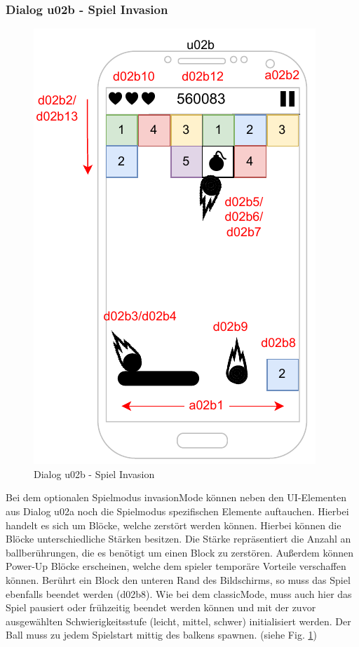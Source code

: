 \subsubsection{Dialog u02b - Spiel Invasion}\label{dialog:invasion}

\begin{figure}[h!]
    \begin{center}
    \includegraphics[scale=1.4]{diagramme/pdf/Mockup-u02b.pdf}
    \end{center}
    \caption{Dialog u02b - Spiel Invasion}\label{fig:dia:u02b}
\end{figure}

Bei dem optionalen Spielmodus \gls{invasionMode} können neben den UI-Elementen aus Dialog u02a noch die Spielmodus spezifischen Elemente auftauchen. 
Hierbei handelt es sich um Blöcke, welche zerstört werden können. Hierbei können die Blöcke unterschiedliche Stärken besitzen. 
Die Stärke repräsentiert die Anzahl an \gls{ball}berührungen, die es benötigt um einen Block zu zerstören. Außerdem können Power-Up Blöcke
erscheinen, welche dem \gls{spieler} temporäre Vorteile verschaffen können. Berührt ein Block den unteren Rand des Bildschirms, so muss das Spiel ebenfalls beendet werden (d02b8).
Wie bei dem \gls{classicMode}, muss auch hier das Spiel pausiert oder frühzeitig beendet werden können und mit der zuvor ausgewählten Schwierigkeitsstufe (leicht, mittel, schwer) initialisiert werden. Der Ball muss zu jedem Spielstart mittig des \glspl{balken} spawnen.
(siehe Fig. \ref{fig:dia:u02b})
\clearpage

